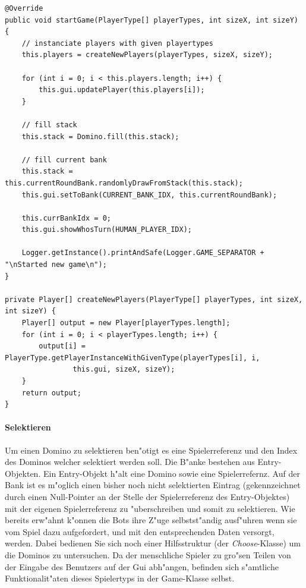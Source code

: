 \begin{lstlisting}[float,style=CodeHighlighting,caption=Game - startGame,label=game_startGame]
@Override
public void startGame(PlayerType[] playerTypes, int sizeX, int sizeY) {
    // instanciate players with given playertypes
    this.players = createNewPlayers(playerTypes, sizeX, sizeY);

    for (int i = 0; i < this.players.length; i++) {
        this.gui.updatePlayer(this.players[i]);
    }

    // fill stack
    this.stack = Domino.fill(this.stack);

    // fill current bank
    this.stack = this.currentRoundBank.randomlyDrawFromStack(this.stack);
    this.gui.setToBank(CURRENT_BANK_IDX, this.currentRoundBank);

    this.currBankIdx = 0;
    this.gui.showWhosTurn(HUMAN_PLAYER_IDX);

    Logger.getInstance().printAndSafe(Logger.GAME_SEPARATOR + "\nStarted new game\n");
}

private Player[] createNewPlayers(PlayerType[] playerTypes, int sizeX, int sizeY) {
    Player[] output = new Player[playerTypes.length];
    for (int i = 0; i < playerTypes.length; i++) {
        output[i] = PlayerType.getPlayerInstanceWithGivenType(playerTypes[i], i, 
        		this.gui, sizeX, sizeY);
    }
    return output;
}
\end{lstlisting}

\paragraph{Selektieren}
Um einen Domino zu selektieren ben"otigt es eine Spielerreferenz und den Index des Dominos welcher selektiert werden soll. Die B"anke bestehen aus Entry-Objekten. Ein Entry-Objekt h"alt eine Domino sowie eine Spielerrefernz. 
Auf der Bank ist es m"oglich einen bisher noch nicht selektierten Eintrag (gekennzeichnet durch einen Null-Pointer an der Stelle der Spielerreferenz des Entry-Objektes) mit der eigenen Spielerreferenz zu "uberschreiben und somit zu selektieren. Wie bereits erw"ahnt k"onnen die Bots ihre Z"uge selbstst"andig ausf"uhren wenn sie vom Spiel dazu aufgefordert, und mit den entsprechenden Daten versorgt, werden. Dabei bedienen Sie sich noch einer Hilfsstruktur (der \emph{Choose}-Klasse) um die Dominos zu untersuchen. Da der menschliche Spieler zu gro"sen Teilen von der Eingabe des Benutzers auf der Gui abh"angen, befinden sich s"amtliche Funktionalit"aten dieses Spielertyps in der Game-Klasse selbst. 

